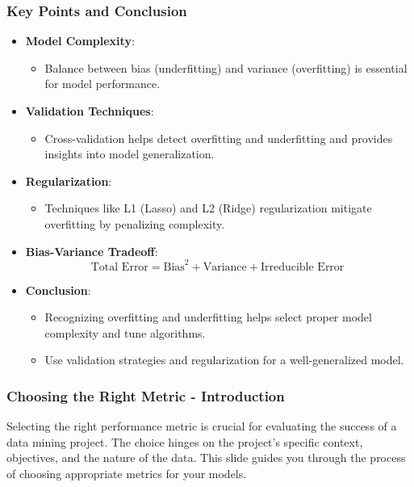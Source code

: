 \documentclass{beamer}
\begin{document}
\begin{frame}[fragile]
    \frametitle{Key Points and Conclusion}
    \begin{itemize}
        \item \textbf{Model Complexity}:
        \begin{itemize}
            \item Balance between bias (underfitting) and variance (overfitting) is essential for model performance.
        \end{itemize}

        \item \textbf{Validation Techniques}:
        \begin{itemize}
            \item Cross-validation helps detect overfitting and underfitting and provides insights into model generalization.
        \end{itemize}

        \item \textbf{Regularization}:
        \begin{itemize}
            \item Techniques like L1 (Lasso) and L2 (Ridge) regularization mitigate overfitting by penalizing complexity.
        \end{itemize}

        \item \textbf{Bias-Variance Tradeoff}:
        \begin{equation}
            \text{Total Error} = \text{Bias}^2 + \text{Variance} + \text{Irreducible Error
            }
        \end{equation}

        \item \textbf{Conclusion}:
        \begin{itemize}
            \item Recognizing overfitting and underfitting helps select proper model complexity and tune algorithms.
            \item Use validation strategies and regularization for a well-generalized model.
        \end{itemize}
    \end{itemize}
\end{frame}

\begin{frame}[fragile]
    \frametitle{Choosing the Right Metric - Introduction}
    Selecting the right performance metric is crucial for evaluating the success of a data mining project. The choice hinges on the project's specific context, objectives, and the nature of the data. This slide guides you through the process of choosing appropriate metrics for your models.
\end{frame}
\end{document}
